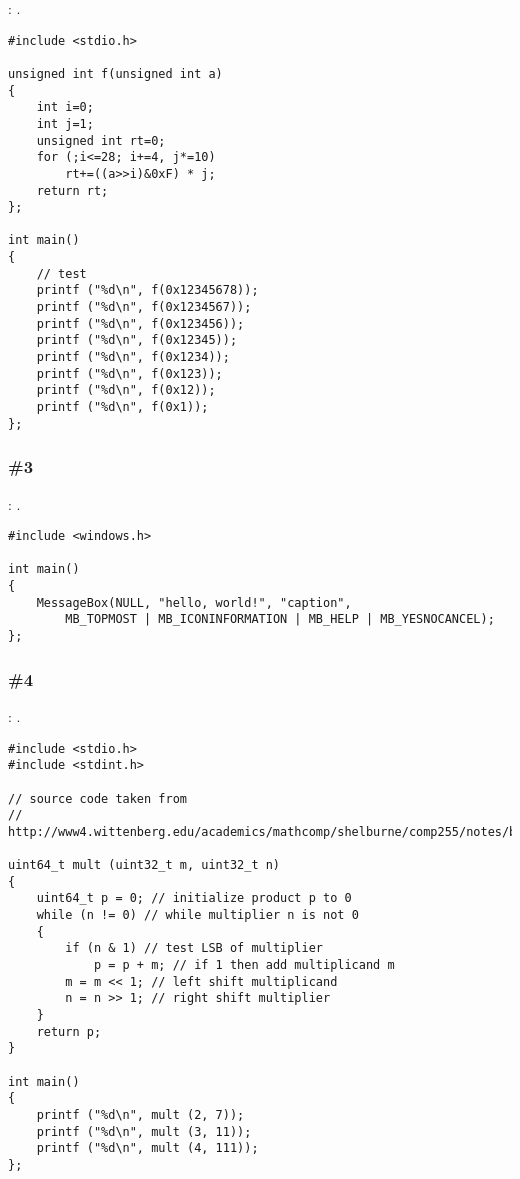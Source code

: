\Exercise: .


\begin{lstlisting}
#include <stdio.h>

unsigned int f(unsigned int a)
{
	int i=0;
	int j=1;
	unsigned int rt=0;
	for (;i<=28; i+=4, j*=10)
		rt+=((a>>i)&0xF) * j;
	return rt;
};

int main()
{
	// test
	printf ("%d\n", f(0x12345678));
	printf ("%d\n", f(0x1234567));
	printf ("%d\n", f(0x123456));
	printf ("%d\n", f(0x12345));
	printf ("%d\n", f(0x1234));
	printf ("%d\n", f(0x123));
	printf ("%d\n", f(0x12));
	printf ("%d\n", f(0x1));
};
\end{lstlisting}

\subsubsection{\Exercise \#3}
\label{exercise_solutions_bitfields_3}

\Exercise: .

\begin{lstlisting}
#include <windows.h>

int main()
{
	MessageBox(NULL, "hello, world!", "caption", 
		MB_TOPMOST | MB_ICONINFORMATION | MB_HELP | MB_YESNOCANCEL);
};
\end{lstlisting}

\subsubsection{\Exercise \#4}
\label{exercise_solutions_bitfields_4}

\Exercise: .


\begin{lstlisting}
#include <stdio.h>
#include <stdint.h>

// source code taken from
// http://www4.wittenberg.edu/academics/mathcomp/shelburne/comp255/notes/binarymultiplication.pdf

uint64_t mult (uint32_t m, uint32_t n)
{
    uint64_t p = 0; // initialize product p to 0 
    while (n != 0) // while multiplier n is not 0 
    { 
        if (n & 1) // test LSB of multiplier 
            p = p + m; // if 1 then add multiplicand m 
        m = m << 1; // left shift multiplicand 
        n = n >> 1; // right shift multiplier 
    }
    return p;
}

int main()
{
    printf ("%d\n", mult (2, 7));
    printf ("%d\n", mult (3, 11));
    printf ("%d\n", mult (4, 111));
};
\end{lstlisting}

